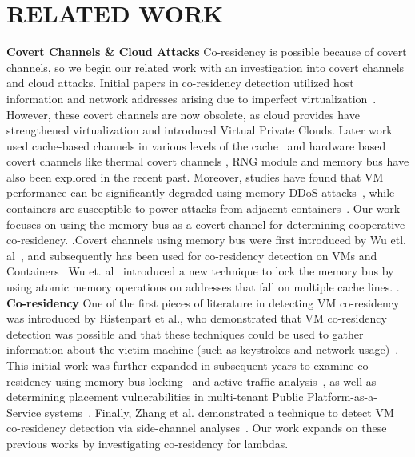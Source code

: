 \section{RELATED WORK}
\label{sec:relatedwork}

\textbf{Covert Channels \& Cloud Attacks} Co-residency is possible because of
covert channels, so we begin our related work with an investigation into covert
channels and cloud attacks. Initial papers in co-residency detection utilized
host information and network addresses arising due to imperfect
virtualization~\cite{ristenpartccs2009}. However, these covert channels are now
obsolete, as cloud provides have strengthened virtualization and introduced
Virtual Private Clouds. Later work used cache-based channels in
various levels of the cache~\cite{xuccsw2011, zhangccs2014, liu2015,
kaylaap2016} and hardware based covert channels like thermal covert channels
\cite{mastiusenix2015}, RNG module \cite{evtyushkinccs2016} and memory bus
\cite{wuusenix2012} have also been  explored in the recent past. Moreover,
studies have found that VM performance can be significantly degraded using
memory DDoS attacks~\cite{zhang2016memory}, while containers are susceptible to
power attacks from adjacent containers~\cite{gao2017}. Our work focuses on using
the memory bus as a covert channel for determining cooperative co-residency.
.Covert channels using memory bus were first introduced
by Wu etl. al~\cite{whispers}, and subsequently has been used for co-residency
detection on VMs and Containers~\cite{compstudycoresidency,varad191016}  Wu et.
al~\cite{whispers} introduced a new technique to lock the memory bus by using
atomic memory operations on addresses that fall on multiple cache lines. .  \\

\textbf{Co-residency} One of the first pieces of literature in detecting VM
co-residency was introduced by Ristenpart et al., who demonstrated that VM
co-residency detection was possible and that these techniques could be used to
gather information about the victim machine (such as keystrokes and network
usage)~\cite{ristenpartccs2009}. This initial work was further expanded in
subsequent years to examine co-residency using memory bus
locking~\cite{xuusenix2015} and active traffic analysis~\cite{bates2012}, as
well as determining placement vulnerabilities in multi-tenant Public
Platform-as-a-Service systems~\cite{varadarajan2015, zhangpaas2016}. Finally,
Zhang et al. demonstrated a technique to detect VM co-residency detection via
side-channel analyses~\cite{zhang2011}. Our work expands on these previous works
by investigating co-residency for lambdas.\\

